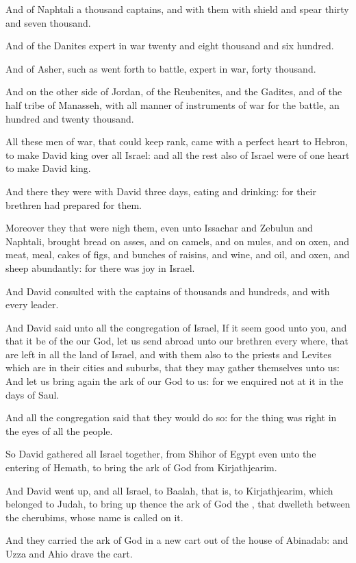 \Verse And of Naphtali a thousand captains, and with them with shield and spear thirty and seven thousand.

\Verse And of the Danites expert in war twenty and eight thousand and six hundred.

\Verse And of Asher, such as went forth to battle, expert in war, forty thousand.

\Verse And on the other side of Jordan, of the Reubenites, and the Gadites, and of the half tribe of Manasseh, with all manner of instruments of war for the battle, an hundred and twenty thousand.

\Verse All these men of war, that could keep rank, came with a perfect heart to Hebron, to make David king over all Israel: and all the rest also of Israel were of one heart to make David king.

\Verse And there they were with David three days, eating and drinking: for their brethren had prepared for them.

\Verse Moreover they that were nigh them, even unto Issachar and Zebulun and Naphtali, brought bread on asses, and on camels, and on mules, and on oxen, and meat, meal, cakes of figs, and bunches of raisins, and wine, and oil, and oxen, and sheep abundantly: for there was joy in Israel.


\Chapter
\Verse And David consulted with the captains of thousands and hundreds, and with every leader.

\Verse And David said unto all the congregation of Israel, If it seem good unto you, and that it be of the \LORD our God, let us send abroad unto our brethren every where, that are left in all the land of Israel, and with them also to the priests and Levites which are in their cities and suburbs, that they may gather themselves unto us: \Verse And let us bring again the ark of our God to us: for we enquired not at it in the days of Saul.

\Verse And all the congregation said that they would do so: for the thing was right in the eyes of all the people.

\Verse So David gathered all Israel together, from Shihor of Egypt even unto the entering of Hemath, to bring the ark of God from Kirjathjearim.

\Verse And David went up, and all Israel, to Baalah, that is, to Kirjathjearim, which belonged to Judah, to bring up thence the ark of God the \LORD, that dwelleth between the cherubims, whose name is called on it.

\Verse And they carried the ark of God in a new cart out of the house of Abinadab: and Uzza and Ahio drave the cart.

